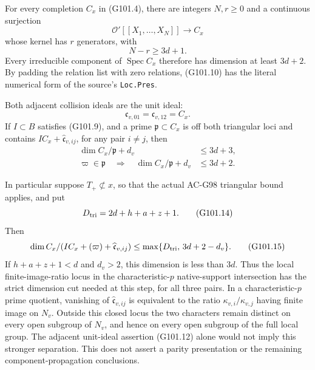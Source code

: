 \begin{theorem}
\label{AC-G101-local}
For every completion \(C_x\) in (G101.4), there are integers
\(N,r\ge0\) and a continuous surjection
\[
 \mathcal O'[[X_1,\ldots,X_N]]\longrightarrow C_x
 \tag{G101.10}
\]
whose kernel has \(r\) generators, with
\[
                         N-r\ge3d+1.
 \tag{G101.11}
\]
Every irreducible component of \(\operatorname{Spec}C_x\)
therefore has dimension at least \(3d+2\).
By padding the relation list with zero relations, (G101.10)
has the literal numerical form of the source's \texttt{Loc.Pres}.

Both adjacent collision ideals are the unit ideal:
\[
                  \mathfrak c_{v,01}
                    =\mathfrak c_{v,12}=C_x .
 \tag{G101.12}
\]
If \(I\subset B\) satisfies (G101.9), and a prime
\(\mathfrak p\subset C_x\) is off both triangular loci and
contains \(IC_x+\widehat{\mathfrak c}_{v,ij}\), for any
pair \(i\ne j\), then
\[
 \begin{split}
 \dim C_x/\mathfrak p+d_v&\le3d+3,\\
 \varpi\in\mathfrak p
       \quad\Longrightarrow\quad
 \dim C_x/\mathfrak p+d_v&\le3d+2.
 \end{split}
 \tag{G101.13}
\]

In particular suppose \(T_+\not\subset x\), so that the
actual AC-G98 triangular bound applies, and put
\[
                   D_{\rm tri}=2d+h+a+z+1 .
 \tag{G101.14}
\]
Then
\[
 \dim C_x/(IC_x+(\varpi)+\widehat{\mathfrak c}_{v,ij})
       \le\max\{D_{\rm tri},\,3d+2-d_v\}.
 \tag{G101.15}
\]
If \(h+a+z+1<d\) and \(d_v>2\), this dimension is less
than \(3d\).  Thus the local finite-image-ratio locus in
the characteristic-\(p\) native-support intersection has the
strict dimension cut needed at this step, for all three pairs.
In a characteristic-\(p\) prime quotient, vanishing of
\(\widehat{\mathfrak c}_{v,ij}\) is equivalent to the ratio
\(\kappa_{v,i}/\kappa_{v,j}\) having finite image on \(N_v\).
Outside this closed locus the two characters remain distinct
on every open subgroup of \(N_v\), and hence on every open
subgroup of the full local group.
The adjacent unit-ideal assertion (G101.12) alone would not
imply this stronger separation.
This does not assert a parity presentation or the remaining
component-propagation conclusions.
\end{theorem}

